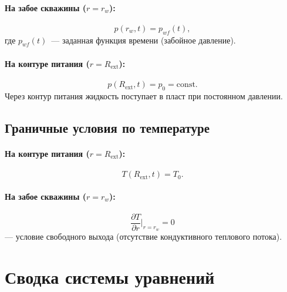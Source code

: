 \documentclass[12pt,a4paper]{article}
\begin{document}
\paragraph{На забое скважины ($r = r_w$):}
\begin{equation}\label{eq:bc_p_well}
  p(r_w, t) = p_{wf}(t),
\end{equation}
где $p_{wf}(t)$~--- заданная функция времени (забойное давление).

\paragraph{На контуре питания ($r = R_{\mathrm{ext}}$):}
\begin{equation}\label{eq:bc_p_ext}
  p(R_{\mathrm{ext}}, t) = p_0 = \mathrm{const}.
\end{equation}
Через контур питания жидкость поступает в пласт при постоянном давлении.

\subsection{Граничные условия по температуре}\label{ssec:bc_T}

\paragraph{На контуре питания ($r = R_{\mathrm{ext}}$):}
\begin{equation}\label{eq:bc_T_ext}
  T(R_{\mathrm{ext}}, t) = T_0.
\end{equation}

\paragraph{На забое скважины ($r = r_w$):}
\begin{equation}\label{eq:bc_T_well}
  \frac{\partial T}{\partial r}\bigg|_{r = r_w} = 0
\end{equation}
--- условие свободного выхода (отсутствие кондуктивного теплового потока).


\section{Сводка системы уравнений}\label{sec:summary}
\end{document}
